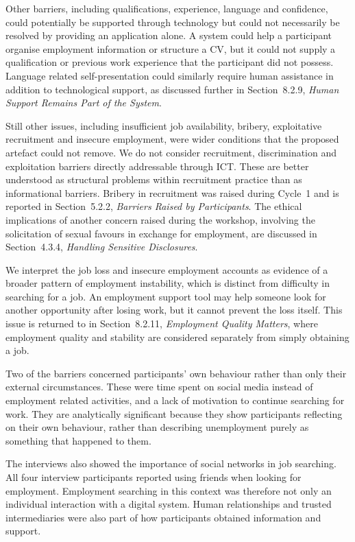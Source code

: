 Other barriers, including qualifications, experience, language and confidence, could potentially be supported through technology but could not necessarily be resolved by providing an application alone. A system could help a participant organise employment information or structure a CV, but it could not supply a qualification or previous work experience that the participant did not possess. Language related self-presentation could similarly require human assistance in addition to technological support, as discussed further in Section~8.2.9, \textit{Human Support Remains Part of the System}.

Still other issues, including insufficient job availability, bribery, exploitative recruitment and insecure employment, were wider conditions that the proposed artefact could not remove. We do not consider recruitment, discrimination and exploitation barriers directly addressable through ICT. These are better understood as structural problems within recruitment practice than as informational barriers. Bribery in recruitment was raised during Cycle~1 and is reported in Section~5.2.2, \textit{Barriers Raised by Participants}. The ethical implications of another concern raised during the workshop, involving the solicitation of sexual favours in exchange for employment, are discussed in Section~4.3.4, \textit{Handling Sensitive Disclosures}.

We interpret the job loss and insecure employment accounts as evidence of a broader pattern of employment instability, which is distinct from difficulty in searching for a job. An employment support tool may help someone look for another opportunity after losing work, but it cannot prevent the loss itself. This issue is returned to in Section~8.2.11, \textit{Employment Quality Matters}, where employment quality and stability are considered separately from simply obtaining a job.

Two of the barriers concerned participants' own behaviour rather than only their external circumstances. These were time spent on social media instead of employment related activities, and a lack of motivation to continue searching for work. They are analytically significant because they show participants reflecting on their own behaviour, rather than describing unemployment purely as something that happened to them.

The interviews also showed the importance of social networks in job searching. All four interview participants reported using friends when looking for employment. Employment searching in this context was therefore not only an individual interaction with a digital system. Human relationships and trusted intermediaries were also part of how participants obtained information and support.

